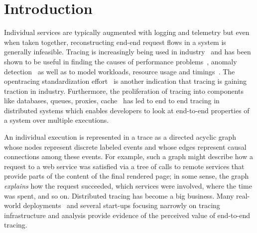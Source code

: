 \section{Introduction}
Individual services are typically augmented with logging and telemetry but even when taken together, reconstructing end-end request flows in a system is generally infeasible. Tracing is increasingly being used in industry~\cite{Jaeger, Zipkin, 36356} and has been shown to be useful in finding the causes of performance problems~\cite{36356, Fonseca:2007:XPN:1973430.1973450, Reynolds:2006:PDU:1267680.1267689, DBLP:conf/sigmetrics/ThereskaSSWALG06, Sambasivan:2011:DPC:1972457.1972463}, anomaly detection~\cite{Barham:2003:MOM:1251054.1251069, Chen:2004:PFE:1251175.1251198, 37477, Sambasivan:2011:DPC:1972457.1972463} as well as to model workloads, resource usage and timings~\cite{Mann:2011:MPE:2170444.2170464, Chanda:2007:WTP:1272996.1273001, 36356, DBLP:conf/sigmetrics/ThereskaSSWALG06, Barham:2003:MOM:1251054.1251069}. The opentracing standardization effort~\cite{OpenTracing} is another indication that tracing is gaining traction in industry. Furthermore, the proliferation of tracing into components like databases, queues, proxies, cache~\cite{OpenTracingCassandra, OpenTracingKafka, OpenTracingRedis} has led to end to end tracing in distributed systems which enables developers to look at end-to-end properties of a system over multiple executions.

An individual execution is represented in a trace as a directed acyclic graph whose nodes represent discrete labeled events and whose edges represent causal connections among these events.  For example, such a graph might describe how a request to a web service was satisfied via a tree of calls to remote services that provide parts of the 
content of the final rendered page; in some sense, the graph \emph{explains} how the request succeeded, which services were involved, where the time was spent, and so on. Distributed tracing has become a big business.  Many real-world deployments~ and several start-ups focusing narrowly on tracing infrastructure and analysis provide evidence of the perceived value of end-to-end tracing.  

